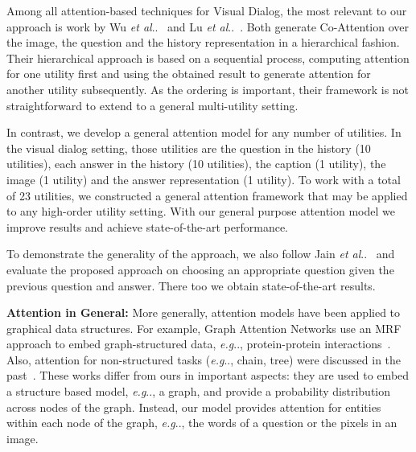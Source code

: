 \documentclass[10pt,twocolumn,letterpaper]{article}
\makeatletter
\def\@onedot{\ifx\@let@token.\else.\null\fi\xspace}
\DeclareRobustCommand\onedot{\futurelet\@let@token\@onedot}
\def\eg{\emph{e.g}\onedot} \def\Eg{\emph{E.g}\onedot}
\def\etal{\emph{et al}\onedot}
\makeatother
\begin{document}
Among all attention-based techniques for Visual Dialog, the most relevant to our approach is work by Wu \etal~\cite{wu2017you} and Lu \etal~\cite{lu2017best}. Both generate  Co-Attention over the image, the question and the history representation in a hierarchical fashion. Their hierarchical approach is based on a sequential process, computing attention for one utility first and using the obtained result to generate attention for another utility subsequently. As the ordering is important, their framework is not straightforward to extend to a general multi-utility setting. 

In contrast, we develop a general attention model for any number of utilities. In the visual dialog setting, those utilities are the question in the history (10 utilities), each answer in the history (10 utilities), the caption (1 utility), the image (1 utility) and the answer representation (1 utility).  To work with a total of 23 utilities, we constructed a general attention framework that may be applied to any high-order utility setting. With our general purpose attention model we improve  results and achieve state-of-the-art performance. 


To demonstrate the generality of the  approach, we also follow Jain \etal~\cite{jain2018two} and evaluate the proposed approach on choosing an appropriate question given the previous question and answer. There too we obtain state-of-the-art results. 



\noindent\textbf{Attention in General:} 
More generally, attention models have been applied to graphical data structures. For example, Graph Attention Networks use an MRF approach to embed graph-structured data, \eg, protein-protein interactions~\cite{velivckovic2017graph}. Also, attention for non-structured tasks (\eg, chain, tree) were discussed in the past~\cite{kim2017structured}. These works differ from ours in important aspects: they are used to embed a structure based model, \eg,  a graph, and provide  a probability distribution  
across nodes of the graph. Instead, our model provides attention for entities within 
each node of the graph, \eg, the words of a question or the pixels in an image.  







 
\end{document}
